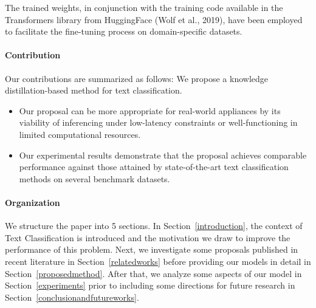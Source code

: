 \documentclass[sn-mathphys,Numbered]{sn-jnl}%
\theoremstyle{thmstyleone}%
\theoremstyle{thmstyletwo}%
\theoremstyle{thmstylethree}%
\begin{document}
The trained weights, in conjunction with the training code available in the Transformers library from HuggingFace (Wolf et al., 2019)\cite{Wolf2019}, have been employed to facilitate the fine-tuning process on domain-specific datasets.

\paragraph{Contribution}
Our contributions are summarized as follows:
We propose a knowledge distillation-based method for text classification. 
\begin{itemize}
    \item Our proposal can be more appropriate for real-world appliances by its viability of inferencing under low-latency constraints or well-functioning in limited computational resources.
    \item Our experimental results demonstrate that the proposal achieves comparable performance against those attained by state-of-the-art text classification methods on several benchmark datasets.
\end{itemize}

\paragraph{Organization}
We structure the paper into 5 sections. In Section~\ref{introduction}, the context of Text Classification is introduced and the motivation we draw to improve the performance of this problem. Next, we investigate some proposals published in recent literature in Section~\ref{relatedworks} before providing our models in detail in Section~\ref{proposedmethod}. After that, we analyze some aspects of our model in Section~\ref{experiments} prior to including some directions for future research in Section~\ref{conclusionandfutureworks}.
\end{document}

